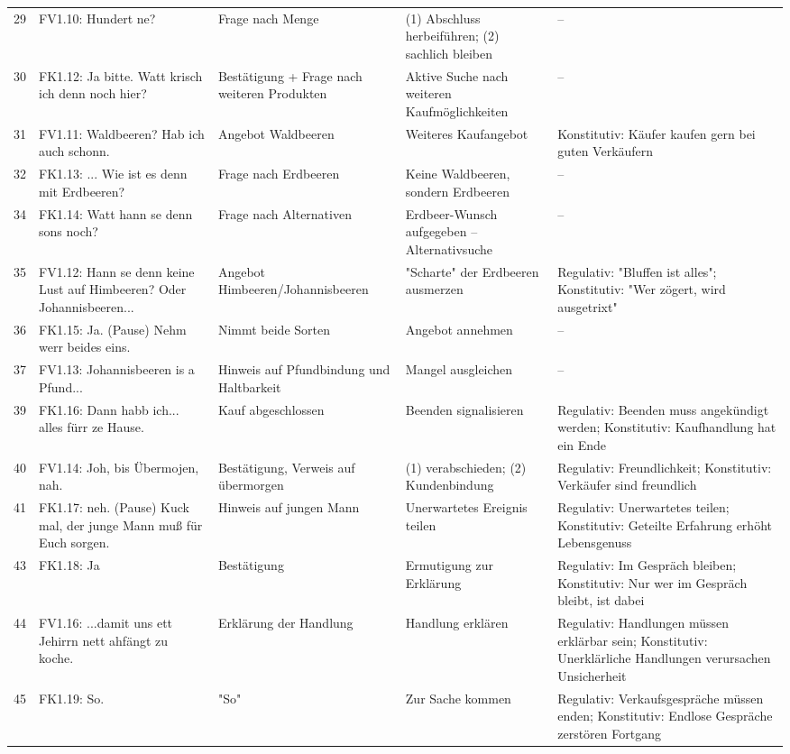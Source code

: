 \documentclass[11pt]{article}
\begin{document}
\begin{longtable}{p{0.8cm}|p{3.5cm}|p{3.5cm}|p{3cm}|p{3cm}}
29 & FV1.10: Hundert ne? & Frage nach Menge & (1) Abschluss herbeiführen; (2) sachlich bleiben & – \\
30 & FK1.12: Ja bitte. Watt krisch ich denn noch hier? & Bestätigung + Frage nach weiteren Produkten & Aktive Suche nach weiteren Kaufmöglichkeiten & – \\
31 & FV1.11: Waldbeeren? Hab ich auch schonn. & Angebot Waldbeeren & Weiteres Kaufangebot & Konstitutiv: Käufer kaufen gern bei guten Verkäufern \\
32 & FK1.13: ... Wie ist es denn mit Erdbeeren? & Frage nach Erdbeeren & Keine Waldbeeren, sondern Erdbeeren & – \\
34 & FK1.14: Watt hann se denn sons noch? & Frage nach Alternativen & Erdbeer-Wunsch aufgegeben – Alternativsuche & – \\
35 & FV1.12: Hann se denn keine Lust auf Himbeeren? Oder Johannisbeeren... & Angebot Himbeeren/Johannisbeeren & "Scharte" der Erdbeeren ausmerzen & Regulativ: "Bluffen ist alles"; Konstitutiv: "Wer zögert, wird ausgetrixt" \\
36 & FK1.15: Ja. (Pause) Nehm werr beides eins. & Nimmt beide Sorten & Angebot annehmen & – \\
37 & FV1.13: Johannisbeeren is a Pfund... & Hinweis auf Pfundbindung und Haltbarkeit & Mangel ausgleichen & – \\
39 & FK1.16: Dann habb ich... alles fürr ze Hause. & Kauf abgeschlossen & Beenden signalisieren & Regulativ: Beenden muss angekündigt werden; Konstitutiv: Kaufhandlung hat ein Ende \\
40 & FV1.14: Joh, bis Übermojen, nah. & Bestätigung, Verweis auf übermorgen & (1) verabschieden; (2) Kundenbindung & Regulativ: Freundlichkeit; Konstitutiv: Verkäufer sind freundlich \\
41 & FK1.17: neh. (Pause) Kuck mal, der junge Mann muß für Euch sorgen. & Hinweis auf jungen Mann & Unerwartetes Ereignis teilen & Regulativ: Unerwartetes teilen; Konstitutiv: Geteilte Erfahrung erhöht Lebensgenuss \\
43 & FK1.18: Ja & Bestätigung & Ermutigung zur Erklärung & Regulativ: Im Gespräch bleiben; Konstitutiv: Nur wer im Gespräch bleibt, ist dabei \\
44 & FV1.16: ...damit uns ett Jehirrn nett ahfängt zu koche. & Erklärung der Handlung & Handlung erklären & Regulativ: Handlungen müssen erklärbar sein; Konstitutiv: Unerklärliche Handlungen verursachen Unsicherheit \\
45 & FK1.19: So. & "So" & Zur Sache kommen & Regulativ: Verkaufsgespräche müssen enden; Konstitutiv: Endlose Gespräche zerstören Fortgang \\

\end{longtable}
\end{document}
